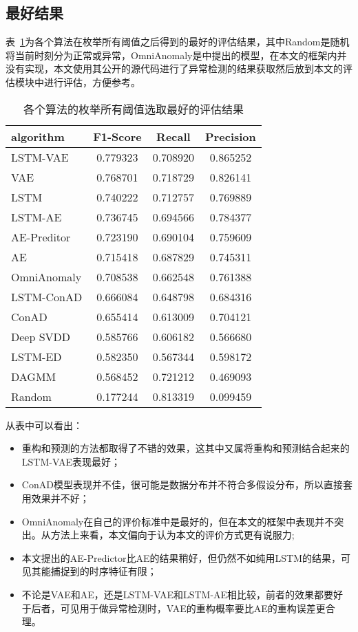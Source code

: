 \subsection{最好结果}
表~\ref{tab:best}为各个算法在枚举所有阈值之后得到的最好的评估结果，其中Random是随机将当前时刻分为正常或异常，OmniAnomaly是\cite{su2019robust}中提出的模型，在本文的框架内并没有实现，本文使用其公开的源代码进行了异常检测的结果获取然后放到本文的评估模块中进行评估，方便参考。
\begin{table}[htbp]
  \centering
\begin{tabular}{lccc}
  \toprule
          algorithm &  F1-Score &    Recall &  Precision \\
  \midrule
   LSTM-VAE &  0.779323 &  0.708920 &   0.865252 \\
        VAE &  0.768701 &  0.718729 &   0.826141 \\
     LSTM &  0.740222 &  0.712757 &   0.769889 \\
            LSTM-AE &  0.736745 &  0.694566 &   0.784377 \\
       AE-Preditor &  0.723190 &  0.690104 &   0.759609 \\
                 AE &  0.715418 &  0.687829 &   0.745311 \\
                 OmniAnomaly &  0.708538 &  0.662548 &   0.761388 \\
         LSTM-ConAD &  0.666084 &  0.648798 &   0.684316 \\
              ConAD &  0.655414 &  0.613009 &   0.704121 \\
          Deep SVDD &  0.585766 &  0.606182 &   0.566680 \\
            LSTM-ED &  0.582350 &  0.567344 &   0.598172 \\
              DAGMM &  0.568452 &  0.721212 &   0.469093 \\
             Random &  0.177244 &  0.813319 &   0.099459 \\
  \bottomrule
  \end{tabular}
  \caption{各个算法的枚举所有阈值选取最好的评估结果}
  \label{tab:best}
\end{table}

从表中可以看出：
\begin{itemize}
  \item 重构和预测的方法都取得了不错的效果，这其中又属将重构和预测结合起来的LSTM-VAE表现最好；
  \item ConAD模型表现并不佳，很可能是数据分布并不符合多假设分布，所以直接套用效果并不好；
  \item OmniAnomaly在自己的评价标准中是最好的，但在本文的框架中表现并不突出。从方法上来看，本文偏向于认为本文的评价方式更有说服力;
  \item 本文提出的AE-Predictor比AE的结果稍好，但仍然不如纯用LSTM的结果，可见其能捕捉到的时序特征有限；
  \item 不论是VAE和AE，还是LSTM-VAE和LSTM-AE相比较，前者的效果都要好于后者，可见用于做异常检测时，VAE的重构概率要比AE的重构误差更合理。
\end{itemize}
